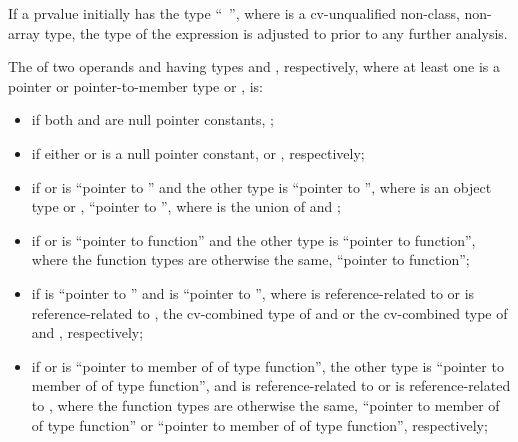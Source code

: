\pnum
If a prvalue initially has the type ``\cv{}~'', where
 is a cv-unqualified non-class, non-array type, the type of
the expression is adjusted to  prior to any further analysis.

\pnum
{}%
The  of
two operands  and
 having types  and , respectively, where at least one is a
pointer or pointer-to-member type or
, is:
\begin{itemize}
\item
if both  and  are null pointer constants,
;

\item
if either  or  is a null pointer constant,  or ,
respectively;

\item
if  or  is ``pointer to  '' and the
other type is ``pointer to  '',
where  is an object type or ,
``pointer to  '',
where  is the union of  and ;

\item
if  or  is ``pointer to  function'' and the
other type is ``pointer to function'', where the function types are otherwise the same,
``pointer to function'';

\item
if  is ``pointer to  '' and  is ``pointer to
 '', where  is reference-related to  or  is
reference-related to ,
the cv-combined type
of  and  or the cv-combined type of  and ,
respectively;

\item
if  or  is
``pointer to member of  of type function'',
the other type is
``pointer to member of  of type  function'', and
 is reference-related to  or
 is reference-related to ,
where the function types are otherwise the same,
``pointer to member of  of type function'' or
``pointer to member of  of type function'', respectively;


\end{itemize}
